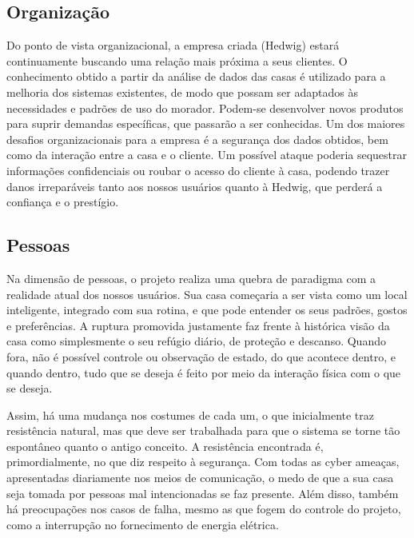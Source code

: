 
\subsection{Organização}

Do ponto de vista organizacional, a empresa criada (Hedwig) estará continuamente buscando uma relação mais próxima a seus clientes. O conhecimento obtido a partir da análise de dados das casas é utilizado para a melhoria dos sistemas existentes, de modo que possam ser adaptados às necessidades e padrões de uso do morador. Podem-se desenvolver novos produtos para suprir demandas específicas, que passarão a ser conhecidas. Um dos maiores desafios organizacionais para a empresa é a segurança dos dados obtidos, bem como da interação entre a casa e o cliente. Um possível ataque poderia sequestrar informações confidenciais ou roubar o acesso do cliente à casa, podendo trazer danos irreparáveis tanto aos nossos usuários quanto à Hedwig, que perderá a confiança e o prestígio.

\subsection{Pessoas}

Na dimensão de pessoas, o projeto realiza uma quebra de paradigma com a realidade atual dos nossos usuários. Sua casa começaria a ser vista como um local inteligente, integrado com sua rotina, e que pode entender os seus padrões, gostos e preferências. A ruptura promovida justamente faz frente à histórica visão da casa como simplesmente o seu refúgio diário, de proteção e descanso. Quando fora, não é possível controle ou observação de estado, do que acontece dentro, e quando dentro, tudo que se deseja é feito por meio da interação física com o que se deseja.

Assim, há uma mudança nos costumes de cada um, o que inicialmente traz resistência natural, mas que deve ser trabalhada para que o sistema se torne tão espontâneo quanto o antigo conceito. A resistência encontrada é, primordialmente, no que diz respeito à segurança. Com todas as cyber ameaças, apresentadas diariamente nos meios de comunicação, o medo de que a sua casa seja tomada por pessoas mal intencionadas se faz presente. Além disso, também há preocupações nos casos de falha, mesmo as que fogem do controle do projeto, como a interrupção no fornecimento de energia elétrica.


